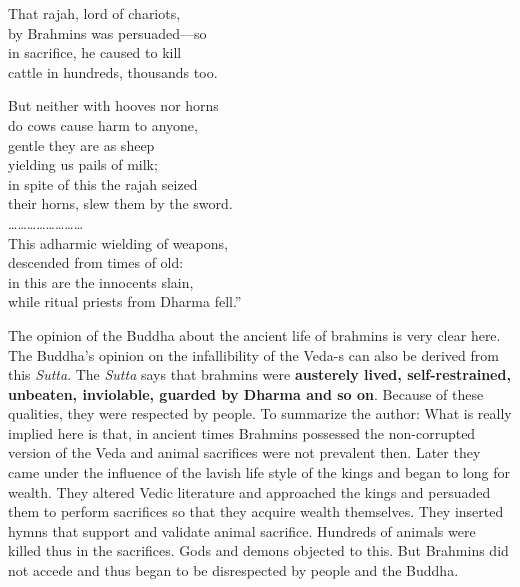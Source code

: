 That rajah, lord of chariots,\\ by Brahmins was persuaded—so\\ in sacrifice, he caused to kill\\ cattle in hundreds, thousands too.

But neither with hooves nor horns\\ do cows cause harm to anyone,\\ gentle they are as sheep\\ yielding us pails of milk;\\ in spite of this the rajah seized\\ their horns, slew them by the sword.\\ ……………………\\ This adharmic wielding of weapons,\\ descended from times of old:\\ in this are the innocents slain,\\ while ritual priests from Dharma fell.”

The opinion of the Buddha about the ancient life of brahmins is very clear here. The Buddha’s opinion on the infallibility of the Veda-s can also be derived from this \textit{Sutta}. The \textit{Sutta} says that brahmins were \textbf{austerely lived, self-restrained, unbeaten, inviolable, guarded by Dharma and so on}. Because of these qualities, they were respected by people. To summarize the author: What is really implied here is that, in ancient times Brahmins possessed the non-corrupted version of the Veda and animal sacrifices were not prevalent then. Later they came under the influence of the lavish life style of the kings and began to long for wealth. They altered Vedic literature and approached the kings and persuaded them to perform sacrifices so that they acquire wealth themselves. They inserted hymns that support and validate animal sacrifice. Hundreds of animals were killed thus in the sacrifices. Gods and demons objected to this. But Brahmins did not accede and thus began to be disrespected by people and the Buddha.

